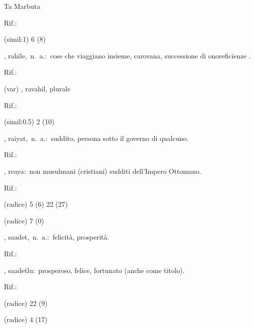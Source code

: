 \begin{glossario}{Ta Marbuta}
\begin{subvocedue}
\begin{subvocedue}
\item[Rif.:] 
\end{subvocedue}
\item[(simil:1)]   6 (8)
\end{subvocedue}
\item[{\color{colorlowref}\spzrl{rA.hila_H}},] {\sf rahile},\ n.\ a.:\ cose che  viaggiano insieme, carovana, successione di onoreficienze \verificare.
\begin{subvocedue}
\item[Rif.:] 
\end{subvocedue}
\begin{subvocedue}
\item[(var)] , {\sf ravahil}, plurale\begin{subvocedue}
\item[Rif.:] 
\end{subvocedue}
\item[(simil:0.5)]   2 (10)
\end{subvocedue}
\item[{\color{colorlowref}\spzrl{ra`iyat}},] {\sf raiyat},\ n.\ a.:\ suddito, persona sotto il governo di qualcuno.
\begin{subvocedue}
\item[Rif.:] 
\end{subvocedue}
\begin{subvocedue}
\item[\subglossariobullet] , {\sf reaya}:\ non    musulmani   (cristiani)   sudditi dell'Impero Ottomano.
\begin{subvocedue}
\item[Rif.:] 
\end{subvocedue}
\item[(radice)]   5 (6) 22 (27)
\item[(radice)]   7 (0)
\end{subvocedue}
\item[{\color{colorlowref}\spzrl{sa`Adat}},] {\sf saadet},\ n.\ a.:\ felicità, prosperità.
\begin{subvocedue}
\item[Rif.:] 
\end{subvocedue}
\begin{subvocedue}
\item[\subglossariobullet] , {\sf saadetlu}:\ prosperoso, felice, fortunato (anche come titolo).
\begin{subvocedue}
\item[Rif.:] 
\end{subvocedue}
\item[(radice)]   22 (9)
\item[(radice)]   4 (17)
\end{subvocedue}



\end{glossario}
